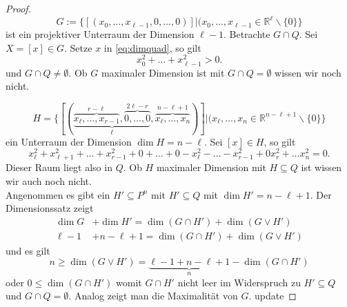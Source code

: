 \documentclass[11pt]{article}
\begin{document}
\begin{proof}
\begin{equation*}
    G:= \{[(x_0,\dots, x_{\ell-1}, 0,\dots,0)]|(x_0,\dots, x_{\ell-1}\in \mathbb R^{\ell}\backslash\{0\}\}
\end{equation*} ist ein projektiver Unterraum der Dimension $\ell-1$. Betrachte $G\cap Q$. Sei $X= [x]\in G$. Setze $x$ in \eqref{eq:dimquad}, so gilt 
\begin{equation*}
     x_0^2 + \dots + x_{\ell-1}^2 > 0.
\end{equation*} und $G\cap Q\neq \emptyset$. Ob $G$ maximaler Dimension ist mit $G\cap Q = \emptyset$ wissen wir noch nicht.

\begin{equation*}
    H= \{[(\underbrace{\overbrace{x_\ell,\dots, x_{r-1}}^{r-\ell},\overbrace{ 0 ,\dots, 0}^{2\ell-r}}_{\ell}, \overbrace{x_\ell,\dots, x_n}^{n-\ell +1})]| (x_\ell, \dots, x_n\in \mathbb R^{n-\ell+1}\backslash \{0\}\}
\end{equation*} ein Unterraum der Dimension $\dim H = n-\ell$. Sei $[x]\in H$, so gilt \begin{equation*}
    x_\ell^2 + x_{\ell+1}^2 + \dots + x_{r-1}^2 + 0 + \dots  + 0 - x_\ell^2 - \dots - x_{r-1}^2 + 0 x_r^2 + \dots x_n^2 = 0.
\end{equation*}
Dieser Raum liegt also in $Q$. Ob $H$ maximaler Dimension mit $H\subseteq Q$ ist wissen wir auch noch nicht.\\
Angenommen es gibt ein $H'\subseteq P^n$ mit $H'\subseteq Q$ mit $\dim H' = n-\ell + 1$. Der Dimensionssatz zeigt \begin{equation*}
\begin{split}
    \dim G &+ \dim H' = \dim (G\cap H') + \dim (G\lor H')\\
    \ell-1 &+n-\ell + 1  =  \dim (G\cap H') + \dim (G\lor H')
\end{split}
\end{equation*}
 und es gilt \begin{equation*}
     n\geq \dim(G\lor H') = \underbrace{\ell-1+n-\ell + 1}_n - \dim(G\cap H')
 \end{equation*}
 oder $0\leq \dim(G\cap H')$ womit $G\cap H'$ nicht leer im Widerspruch zu $H'\subseteq Q$ und $G\cap Q = \emptyset$. Analog zeigt man die Maximalität von $G$. update
\end{proof}
\end{document}
